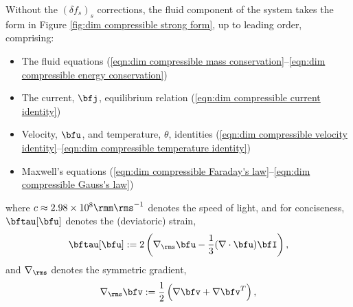 


     Without the $(\delta\!f_{s})_{s}$ corrections, the fluid component of the system takes the form in Figure \ref{fig:dim compressible strong form}, up to leading order, comprising:
    \begin{itemize}
        \item  The fluid equations (\ref{eqn:dim compressible mass conservation}--\ref{eqn:dim compressible energy conservation})
        \item  The current, $\bfj$, equilibrium relation (\ref{eqn:dim compressible current identity})
        \item  Velocity, $\bfu$, and temperature, $\theta$, identities (\ref{eqn:dim compressible velocity identity}--\ref{eqn:dim compressible temperature identity})
        \item  Maxwell's equations (\ref{eqn:dim compressible Faraday's law}--\ref{eqn:dim compressible Gauss's law})
    \end{itemize}
    where $c \approx 2.98\times 10^{8}\rmm\rms^{- 1}$ denotes the speed of light, and for conciseness, $\bftau[\bfu]$ denotes the (deviatoric) strain,
    \begin{equation}\label{eqn:strain equation}
        \bftau[\bfu]  :=  2\left(\nabla_{\rms}\bfu - \frac{1}{3}(\nabla\cdot\bfu)\bfI\right),
    \end{equation}
    and $\nabla_{\rms}$ denotes the symmetric gradient,
    \begin{equation}
        \nabla_{\rms}\bfv  :=  \frac{1}{2}\left(\nabla\bfv + \nabla\bfv^{T}\right),
    \end{equation}


